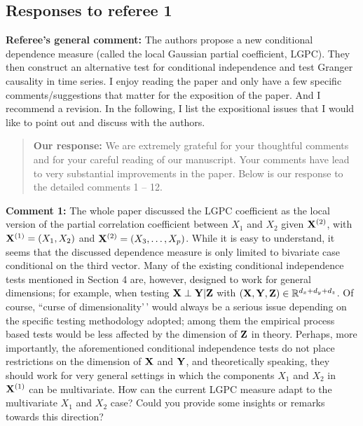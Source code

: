 \documentclass[
  12pt,
  letterpaper]{article}
\author{}
\date{\vspace{-2.5em}}
\numberwithin{equation}{section}
\begin{document}

\hypertarget{responses-to-referee-1}{%
\subsection{Responses to referee 1}\label{responses-to-referee-1}}

\textbf{Referee's general comment:} The authors propose a new conditional dependence measure (called the local Gaussian partial coefficient, LGPC). They then construct an alternative test for conditional independence and test Granger causality in time series. I enjoy reading the paper and only have a few specific comments/suggestions that matter for the exposition of the paper. And I recommend a revision. In the following, I list the expositional issues that I would like to point out and discuss with the authors.

\begin{quote}
\textbf{Our response:} We are extremely grateful for your thoughtful comments and for your careful reading of our manuscript. Your comments have lead to very substantial improvements in the paper. Below is our response to the detailed comments 1 -- 12.
\end{quote}

\textbf{Comment 1:} The whole paper discussed the LGPC coefficient as the local version of the partial correlation coefficient between \(X_1\) and \(X_2\) given \({\bf X}^{(2)}\), with \({\bf X}^{(1)} = (X_1,X_2)\) and \({\bf X}^{(2)} = (X_3,\ldots,X_p)\). While it is easy to understand, it seems that the discussed dependence measure is only limited to bivariate case conditional on the third vector. Many of the existing conditional independence tests mentioned in Section 4 are, however, designed to work for general dimensions; for example, when testing \({\bf X} \perp {\bf Y}|{\bf Z}\) with \(({\bf X},{\bf Y}, {\bf Z}) \in \mathbb{R}^{d_x+d_y+d_z}\). Of course, ``curse of dimensionality'\,' would always be a serious issue depending on the specific testing methodology adopted; among them the empirical process based tests would be less affected by the dimension of \({\bf Z}\) in theory. Perhaps, more importantly, the aforementioned conditional independence tests do not place restrictions on the dimension of \({\bf X}\) and \({\bf Y}\), and theoretically speaking, they should work for very general settings in which the components \(X_1\) and \(X_2\) in \({\bf X}^{(1)}\) can be multivariate. How can the current LGPC measure adapt to the multivariate \(X_1\) and \(X_2\) case? Could you provide some insights or remarks towards this direction?
\end{document}
